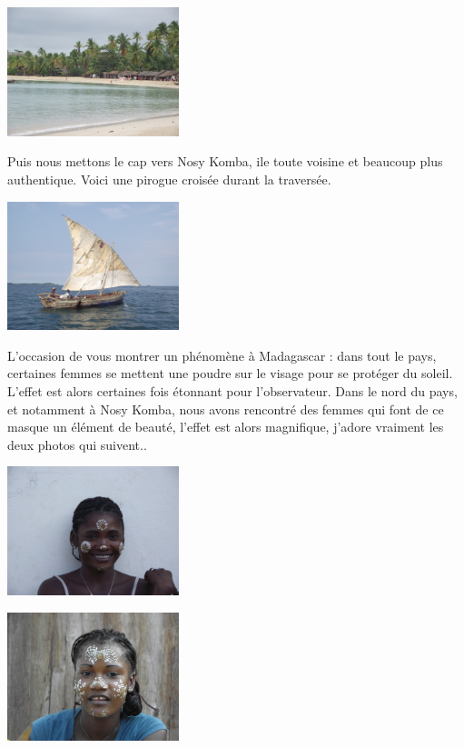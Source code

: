 \begin{multicols}{2}
\smallbreak\smallbreak
\hspace*{-0.65cm}
\includegraphics[width=5cm]{articles/Une-boucle-du-cote-vert/DSCF0418.JPG}
\smallbreak

Puis nous mettons le cap vers Nosy Komba, ile toute voisine et beaucoup plus authentique. Voici une pirogue croisée durant la traversée.

\smallbreak\smallbreak
\hspace*{-0.65cm}
\includegraphics[width=5cm]{articles/Une-boucle-du-cote-vert/DSCF0433.JPG}
\smallbreak

L'occasion de vous montrer un phénomène à Madagascar : dans tout le pays, certaines femmes se mettent une poudre sur le visage pour se protéger du soleil. L'effet est alors certaines fois étonnant pour l'observateur. Dans le nord du pays, et notamment à Nosy Komba, nous avons rencontré des femmes qui font de ce masque un élément de beauté, l'effet est alors magnifique, j'adore vraiment les deux photos qui suivent..

\smallbreak\smallbreak
\hspace*{-0.65cm}
\includegraphics[width=5cm]{articles/Une-boucle-du-cote-vert/DSCF0441.JPG}
\smallbreak

\smallbreak\smallbreak
\hspace*{-0.65cm}
\includegraphics[width=5cm]{articles/Une-boucle-du-cote-vert/DSCF0442.JPG}
\smallbreak


\end{multicols}
